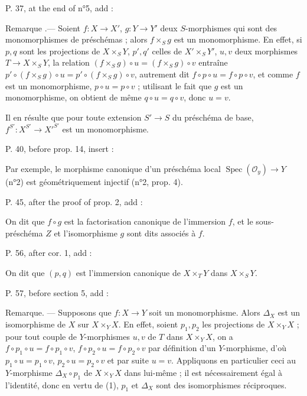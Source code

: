 P. 37, at the end of n°5, add :

Remarque .— Soient $f: X \to X'$, $g: Y \to Y'$ deux $S$-morphismes qui sont des monomorphismes de préschémas ; alors $f \times_S g$ est un monomorphisme. En effet, si $p, q$ sont les projections de $X \times_S Y$, $p', q'$ celles de $X' \times_S Y'$, $u, v$ deux morphismes $T \to X \times_S Y$, la relation $(f \times_S g) \circ u = (f \times_S g) \circ v$ entraîne $p' \circ (f \times_S g) \circ u = p' \circ (f \times_S g) \circ v$, autrement dit $f \circ p \circ u = f \circ p \circ v$, et comme $f$ est un monomorphisme, $p \circ u = p \circ v$ ; utilisant le fait que $g$ est un monomorphisme, on obtient de même $q \circ u = q \circ v$, donc $u=v$.

Il en résulte que pour toute extension $S' \to S$ du préschéma de base, $f^{S'} : X^{S'} \to X'^{S'}$ est un monomorphisme.

P. 40, before prop. 14, insert :

Par exemple, le morphisme canonique d'un préschéma local $\operatorname{Spec}(\mathcal{O}_y) \to Y$ (n°2) est géométriquement injectif (n°2, prop. 4).

P. 45, after the proof of prop. 2, add :

On dit que $f \circ g$ est la factorisation canonique de l'immersion $f$, et le sous-préschéma $Z$ et l'isomorphisme $g$ sont dits associés à $f$.

P. 56, after cor. 1, add :

On dit que $(p, q)$ est l'immersion canonique de $X \times_T Y$ dans $X \times_S Y$.

\newpage


\noindent P. 57, before section 5, add :

Remarque. — Supposons que $f : X \to Y$ soit un monomorphisme. Alors $\Delta_X$ est un isomorphisme de $X$ sur $X \times_Y X$. En effet, soient $p_1, p_2$ les projections de $X \times_Y X$ ; pour tout couple de $Y$-morphismes $u, v$ de $T$ dans $X \times_Y X$, on a $f \circ p_1 \circ u = f \circ p_1 \circ v$, $f \circ p_2 \circ u = f \circ p_2 \circ v$ par définition d'un $Y$-morphisme, d'où $p_1 \circ u = p_1 \circ v$, $p_2 \circ u = p_2 \circ v$ et par suite $u = v$. Appliquons en particulier ceci au $Y$-morphisme $\Delta_X \circ p_1$ de $X \times_Y X$ dans lui-même ; il est nécessairement égal à l'identité, donc en vertu de (1), $p_1$ et $\Delta_X$ sont des isomorphismes réciproques.

\newpage

